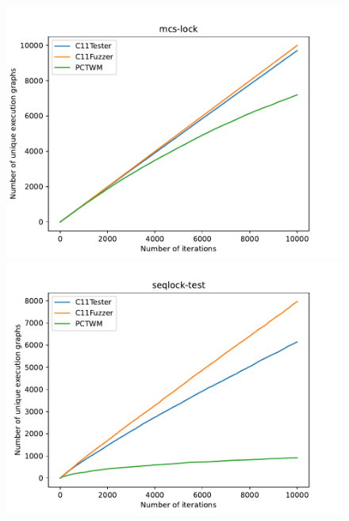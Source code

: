 \begin{figure}[H]
    \begin{minipage}{0.45\textwidth}
        \centering
        \includegraphics[width=\textwidth]{figure/pctwm/mcs-lock.pdf}
    \end{minipage}
    \hfill
    \begin{minipage}{0.45\textwidth}
        \centering
        \includegraphics[width=\textwidth]{figure/pctwm/seqlock-test.pdf}
    \end{minipage}
    \vspace{0.5cm}


\end{figure}
